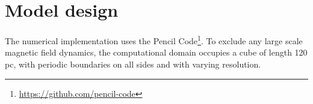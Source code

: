 \documentclass[preprint2]{aastex63}
\newcommand\aastex{AAS\TeX}
\newcommand\latex{La\TeX}
\begin{document}
%

\section{Model design} \label{sec:model}

The numerical implementation uses the {\sc Pencil Code}\footnote{
\url{https://github.com/pencil-code}}.
To exclude any large scale magnetic field dynamics, the computational domain
occupies a cube of length 120 pc, with periodic boundaries on all sides and
with varying resolution.
\end{document}
